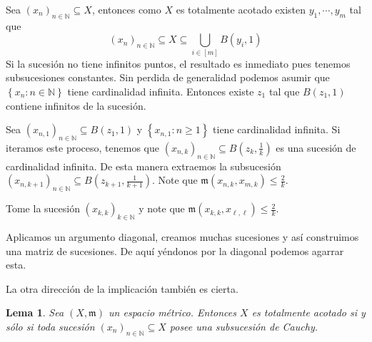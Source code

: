 \documentclass[12pt]{article}
\theoremstyle{plain}
\newtheorem{Lem}[Th]{Lema}             %
\theoremstyle{definition}
\theoremstyle{remark}
\numberwithin{equation}{section}
\newcommand{\bN}{\mathbb{N}}        %
\newcommand{\mm}{\mathfrak{m}}      %
\renewcommand{\geq}{\geqslant}      %
\renewcommand{\leq}{\leqslant}      %
\renewcommand{\:}{\colon}           %
\newcommand{\conj}[1]{\left\lbrace#1\right\rbrace}
\newcommand{\bonj}[1]{\left\lbrack#1\right\rbrack}
\begin{document}
\begin{multicols}{2}
\begin{ptcbp}
Sea $(x_n)_{n\in\bN}\subseteq X$, entonces como $X$ es totalmente acotado existen $y_1,\cdots, y_m$ tal que
$$(x_n)_{n\in\bN}\subseteq X\subseteq\bigcup_{i\in\bonj{m}}B(y_i,1)$$
Si la sucesión no tiene infinitos puntos, el resultado es inmediato pues tenemos subsucesiones constantes. Sin perdida de generalidad podemos asumir que $\conj{x_n\colon n\in\bN}$ tiene cardinalidad infinita. Entonces existe $z_1$ tal que $B(z_1,1)$ contiene infinitos de la sucesión.\par
Sea $(x_{n,1})_{n\in\bN}\subseteq B(z_1,1)$ y $\conj{x_{n,1}\colon n\geq 1}$ tiene cardinalidad infinita. Si iteramos este proceso, tenemos que $(x_{n,k})_{n\in\bN}\subseteq B(z_k,\frac{1}{k})$ es una sucesión de cardinalidad infinita. De esta manera extraemos la subsucesión $(x_{n,k+1})_{n\in\bN}\subseteq B(z_{k+1},\frac{1}{k+1})$. Note que $\mm(x_{n,k},x_{m,k})\leq\frac{2}{k}$.\par
Tome la sucesión $(x_{k,k})_{k\in\bN}$ y note que $\mm(x_{k,k},x_{\ell,\ell})\leq\frac{2}{k}$.
\end{ptcbp}

Aplicamos un argumento diagonal, creamos muchas sucesiones y así construimos una matriz de sucesiones. De aquí yéndonos por la diagonal podemos agarrar esta.

\iffalse
Totalmente acotado nos da la cantidad finita de bolas. Tenemos infinitos señores en una cantidad finita de bolas. Hay una bola con infinitos de estos. Seguimos cubriendo el espacio, pero con bolas de radio menor $(1\to \frac{1}{2})$. Nuevamente una de estas bolas tiene una cantidad infinita de elementos. Otra vez existe una de estas bolas de medio radio que contiene infinitos señores. Seguimos sacando infinitos en bolas de tamaño un tercio, un cuarto, un quinto,... La subsucesión en el quinto paso es subsucesión de la cuarto paso que a su vez es del tercer paso y así. Pero estas subsucesiones son de los señores que ya había filtrado. \par
En algún momento llegue al paso $k$ y agarro una subsucesión infinita en una bola aún más pequeña. En el paso $k$ todos los puntos están apelotados. En el paso $\ell\geq k$ todos los del paso $\ell$ eran del paso $k$. Por la manera escogida no se repiten puntos.
\fi

La otra dirección de la implicación también es cierta.

\begin{Lem}
  Sea $(X,\mm)$ un espacio métrico. Entonces $X$ es totalmente acotado si y sólo si toda sucesión $(x_n)_{n\in\bN}\subseteq X$ posee una subsucesión de Cauchy.
\end{Lem}


\end{multicols}
\end{document}

